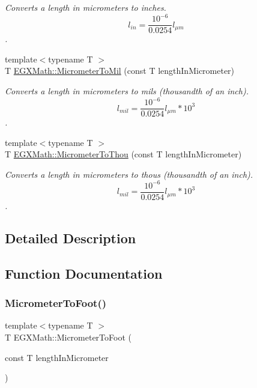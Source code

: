 \begin{DoxyCompactItemize}
\begin{DoxyCompactList}\small\item\em Converts a length in micrometers to inches. \[ l_{in}= \frac{10^{-6}}{0.0254} l_{\mu m} \]. \end{DoxyCompactList}\item 
{\footnotesize template$<$typename T $>$ }\\T \mbox{\hyperlink{group___e_g_x_math-_conversions-_length_conversions-_s_i-_micrometer-_imperial_ga94d0f5a6ba598898a13e3a8837d7c681}{E\+G\+X\+Math\+::\+Micrometer\+To\+Mil}} (const T length\+In\+Micrometer)
\begin{DoxyCompactList}\small\item\em Converts a length in micrometers to mils (thousandth of an inch). \[ l_{mil}= \frac{10^{-6}}{0.0254} l_{\mu m} * 10^{3} \]. \end{DoxyCompactList}\item 
{\footnotesize template$<$typename T $>$ }\\T \mbox{\hyperlink{group___e_g_x_math-_conversions-_length_conversions-_s_i-_micrometer-_imperial_ga8a2cfa132c629695ff469f66e1ab5919}{E\+G\+X\+Math\+::\+Micrometer\+To\+Thou}} (const T length\+In\+Micrometer)
\begin{DoxyCompactList}\small\item\em Converts a length in micrometers to thous (thousandth of an inch). \[ l_{mil}= \frac{10^{-6}}{0.0254} l_{\mu m} * 10^{3} \]. \end{DoxyCompactList}\end{DoxyCompactItemize}


\subsection{Detailed Description}


\subsection{Function Documentation}
\mbox{\label{group___e_g_x_math-_conversions-_length_conversions-_s_i-_micrometer-_imperial_gaed71a8fede89b4bc87d3967e4d99c30d}} 
\subsubsection{\texorpdfstring{Micrometer\+To\+Foot()}{MicrometerToFoot()}}
{\footnotesize\ttfamily template$<$typename T $>$ \\
T E\+G\+X\+Math\+::\+Micrometer\+To\+Foot (\begin{DoxyParamCaption}\item[{const T}]{length\+In\+Micrometer }\end{DoxyParamCaption})}



